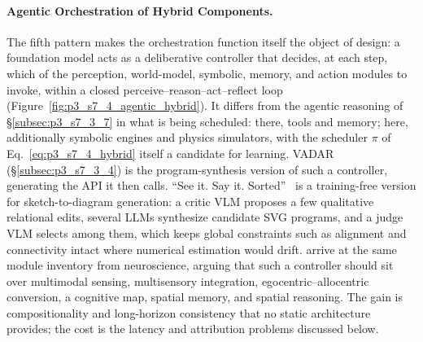 \paragraph{Agentic Orchestration of Hybrid Components.}
The fifth pattern makes the orchestration function itself the object of design: a foundation model acts as a deliberative controller that decides, at each step, which of the perception, world-model, symbolic, memory, and action modules to invoke, within a closed perceive--reason--act--reflect loop (Figure~\ref{fig:p3_s7_4_agentic_hybrid}).
It differs from the agentic reasoning of §\ref{subsec:p3_s7_3_7} in what is being scheduled: there, tools and memory; here, additionally symbolic engines and physics simulators, with the scheduler $\pi$ of Eq.~\eqref{eq:p3_s7_4_hybrid} itself a candidate for learning.
VADAR~\cite{marsili2025visual} (§\ref{subsec:p3_s7_3_4}) is the program-synthesis version of such a controller, generating the API it then calls.
``See it. Say it. Sorted''~\cite{zhang2025seeitsayit} is a training-free version for sketch-to-diagram generation: a critic VLM proposes a few qualitative relational edits, several LLMs synthesize candidate SVG programs, and a judge VLM selects among them, which keeps global constraints such as alignment and connectivity intact where numerical estimation would drift.
\citet{manh2025mindmeetspace} arrive at the same module inventory from neuroscience, arguing that such a controller should sit over multimodal sensing, multisensory integration, egocentric--allocentric conversion, a cognitive map, spatial memory, and spatial reasoning.
The gain is compositionality and long-horizon consistency that no static architecture provides; the cost is the latency and attribution problems discussed below.


